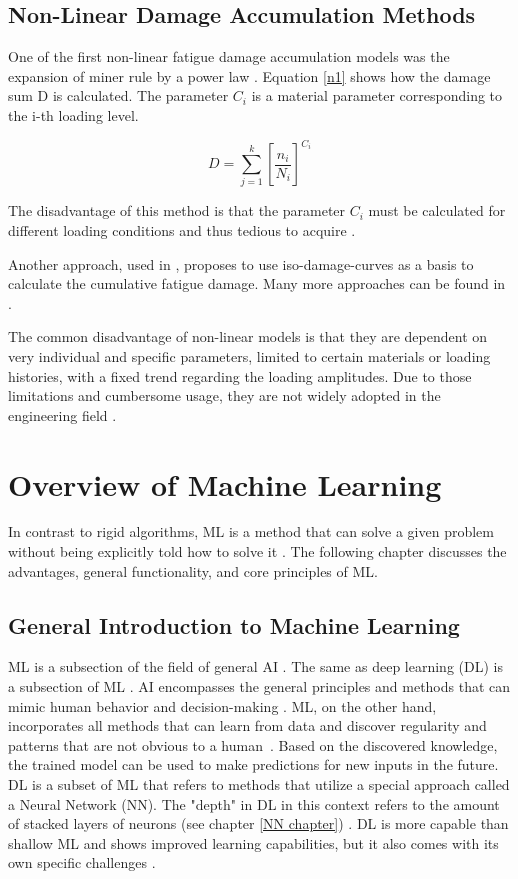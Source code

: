 \subsection{Non-Linear Damage Accumulation Methods}
One of the first non-linear fatigue damage accumulation models was the expansion of miner rule by a power law \cite{Zuo}.
Equation \ref{n1} shows how the damage sum D is calculated. The parameter \(C_i\) is a material parameter corresponding to the i-th loading level. 

\begin{equation}\label{n1}
	D = \sum_{j=1}^{k}\left [\frac{n_i}{N_i}\right ]^{{C_i}}
\end{equation}

The disadvantage of this method is that the parameter \(C_i\) must be calculated for different loading
conditions and thus tedious to acquire \cite{Zuo}.

Another approach, used in \cite{Rege}, proposes to use iso-damage-curves as a basis to calculate the cumulative fatigue damage.\newline
Many more approaches can be found in \cite{Zhu1,Gao,Lv,Chen}.

The common disadvantage of non-linear models is that they are dependent on very individual and specific parameters, limited to certain materials or loading histories, with a fixed trend regarding the loading amplitudes. Due to those limitations and cumbersome usage, they are not widely adopted in the engineering field \cite{Vietze}. 


\section{Overview of Machine Learning}
In contrast to rigid algorithms, ML is a method that can solve a given problem without being explicitly told how to solve it \cite{Sutton,Janiesch}. The following chapter discusses the advantages, general functionality, and core principles of ML.

\subsection{General Introduction to Machine Learning}\label{General Introduction to Machine Learning}
ML is a subsection of the field of general AI \cite{Helm}. The same as deep learning (DL) is a subsection of ML \cite{LeCun}.
AI encompasses the general principles and methods that can mimic human behavior and decision-making \cite{Janiesch}. ML, on the other hand, incorporates all methods that can learn from data and discover regularity and patterns that are not obvious to a human~\cite{Theodoridis}. Based on the discovered knowledge, the trained model can be used to make predictions for new inputs in the future.
DL is a subset of ML that refers to methods that utilize a special approach called a Neural Network (NN). The "depth" in DL in this context refers to the amount of stacked layers of neurons (see chapter \ref{NN chapter}) \cite{Carleo}. 
DL is more capable than shallow ML and shows improved learning capabilities, but it also comes with its own specific challenges \cite{Janiesch, LeCun}.

